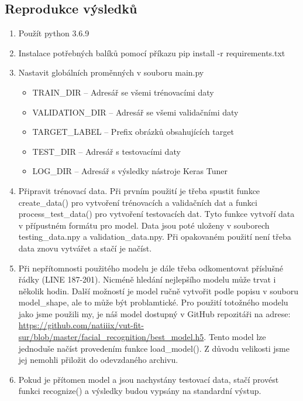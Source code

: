 \documentclass[a4paper,11pt]{article}
\begin{document}
		\subsection{Reprodukce výsledků}
			\begin{enumerate}
				\item Použít python 3.6.9
				\item Instalace potřebných balíků pomocí příkazu pip install -r requirements.txt
				\item Nastavit globálních proměnných v souboru main.py
					\begin{itemize}
						\item TRAIN\_DIR -- Adresář se všemi trénovacími daty
						\item VALIDATION\_DIR -- Adresář se všemi validačními daty
						\item TARGET\_LABEL -- Prefix obrázků obsahujících target
						\item TEST\_DIR -- Adresář s testovacími daty
						\item LOG\_DIR -- Adresář s výsledky nástroje Keras Tuner
					\end{itemize}
				\item Připravit trénovací data. Při prvním použití je třeba spustit funkce create\_data() pro vytvoření trénovacích a validačních dat a funkci process\_test\_data() pro vytvoření testovacích dat. Tyto funkce vytvoří data v přípustném formátu pro model. Data jsou poté uloženy v souborech testing\_data.npy a validation\_data.npy. Při opakovaném použití není třeba data znovu vytvářet a stačí je načíst.
				\item Při nepřítomnosti použitého modelu je dále třeba odkomentovat příslušné řádky (LINE 187-201). Nicméně hledání nejlepšího modelu může trvat i několik hodin. Další možností je model ručně vytvořit podle popisu v souboru model\_shape, ale to může být problamtické. Pro použití totožného modelu jako jsme použili my, je náš model dostupný v GitHub repozitáři na adrese: \url{https://github.com/natiiix/vut-fit-sur/blob/master/facial_recognition/best_model.h5}. Tento model lze jednoduše načíst provedením funkce load\_model(). Z důvodu velikosti jsme jej nemohli přiložit do odevzdaného archivu.
				\item Pokud je přítomen model a jsou nachystány testovací data, stačí provést funkci recognize() a výsledky budou vypsány na standardní výstup. 
			\end{enumerate}
\end{document}
